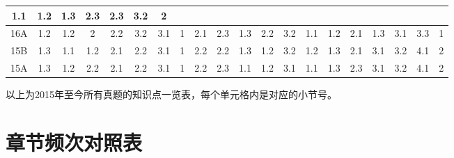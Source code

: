 \begin{changemargin}{-2.5cm}{-2.5cm}
\begin{center}
\begin{tabular}{c*{19}{|c}}
                1.1&1.2&1.3&2.3&2.3&3.2&
                2\\\hline
            16A&1.2&1.2&2&2.2&3.2&3.1&
                1&2.1&2.3&
                1.3&2.2&3.2&
                1.1&1.2&2.1&1.3&3.1&3.3&
                1\\\hline
            15B&1.3&1.1&1.2&2.1&2.2&3.1&
                1&2.2&2.2&
                1.3&1.2&3.2&
                1.2&1.3&2.1&3.1&3.2&4.1&
                2\\\hline
            15A&1.3&1.2&2.2&2.1&2.2&3.1&
                1&2.2&2.3&
                1.1&1.2&3.1&
                1.1&1.3&2.3&3.1&3.2&4.1&
                2\\\hline
        \end{tabular}
    \end{center}
\end{changemargin}
以上为2015年至今所有真题的知识点一览表，每个单元格内是对应的小节号。

\section{章节频次对照表}

